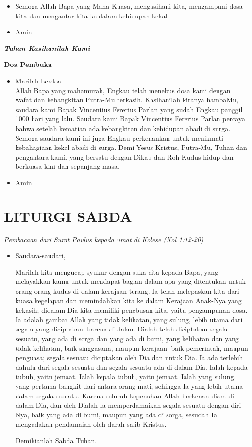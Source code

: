 \documentclass[titlepage,10pt,openany]{scrbook}
\makeatletter
\newcommand{\subjudul}[1]{%
  {\parindent \z@ 
    \interlinepenalty\@M \bfseries #1\par\nobreak \vskip 10\p@ }}
\newcommand{\lagu}[1]{%
  {\parindent \z@ 
    \interlinepenalty\@M \slshape \bfseries \normalsize \textit{#1}\par\nobreak \vskip 10\p@ }}
\newcommand{\keterangan}[1]{%
  {\parindent \z@  \slshape 
    \interlinepenalty\@M \textsl{#1}\par\nobreak  \vskip 5\p@}}
\newcommand{\BU}[1]{\begin{itemize} \item[U:] #1 \end{itemize}}
\newcommand{\BI}[1]{\begin{itemize} \item[I:] #1 \end{itemize}}
\newcommand{\BP}[1]{\begin{itemize} \item[P:] #1 \end{itemize}}
\newcommand{\namaalm}{Bapak Vincentius Fererius Parlan\xspace}
\makeatother
\begin{document}
\BI{Semoga Allah Bapa yang Maha Kuasa, mengasihani kita, 
mengampuni dosa kita dan mengantar kita ke dalam 
kehidupan kekal.}

\BU{Amin}

\lagu{Tuhan Kasihanilah Kami} 

\subjudul{Doa Pembuka}

\BI{Marilah berdoa\\
Allah Bapa yang mahamurah, Engkau telah menebus dosa 
kami dengan wafat dan kebangkitan Putra-Mu terkasih. 
Kasihanilah kiranya hambaMu, saudara kami \namaalm yang sudah Engkau panggil 1000 hari yang lalu. Saudara kami \namaalm percaya 
bahwa setelah kematian ada kebangkitan dan kehidupan abadi 
di surga. Semoga saudara kami ini juga Engkau perkenankan 
untuk menikmati kebahagiaan kekal abadi di surga. Demi 
Yesus Kristus, Putra-Mu, Tuhan dan pengantara kami, yang 
bersatu dengan Dikau dan Roh Kudus hidup dan berkuasa kini 
dan sepanjang masa. }

\BU{Amin}

 

\section*{LITURGI SABDA} 

\keterangan{Pembacaan dari Surat Paulus kepada umat di
Kolese (Kol 1:12-20)}

\BP{Saudara-saudari, 
	
	Marilah kita mengucap syukur dengan suka cita kepada 
	Bapa, yang melayakkan kamu untuk mendapat bagian dalam 
	apa yang ditentukan untuk orang orang kudus di dalam kerajaan 
	terang. Ia telah melepaskan kita dari kuasa kegelapan dan 
	memindahkan kita ke dalam Kerajaan Anak-Nya yang kekasih; 
	didalam Dia kita memiliki penebusan kita, yaitu pengampunan 
	dosa. Ia adalah gambar Allah yang tidak kelihatan, yang 
	sulung, lebih utama dari segala yang diciptakan, karena di 
	dalam Dialah telah diciptakan segala sesuatu, yang ada di sorga 
	dan yang ada di bumi, yang kelihatan dan yang tidak kelihatan, 
	baik singgasana, maupun kerajaan, baik pemerintah, maupun 
	penguasa; segala sesuatu diciptakan oleh Dia dan untuk Dia. Ia 
	ada terlebih dahulu dari segala sesuatu dan segala sesuatu ada 
	di dalam Dia. Ialah kepada tubuh, yaitu jemaat. Ialah kepala 
	tubuh, yaitu jemaat. Ialah yang sulung, yang pertama bangkit 
	dari antara orang mati, sehingga Ia yang lebih utama dalam 
	segala sesuatu. Karena seluruh kepenuhan Allah berkenan diam 
	di dalam Dia, dan oleh Dialah Ia memperdamaikan segala 
	sesuatu dengan diri-Nya, baik yang ada di bumi, maupun yang 
	ada di sorga, sesudah Ia mengadakan pendamaian oleh darah 
	salib Kristus.
	
	
Demikianlah Sabda Tuhan.}
\end{document}
